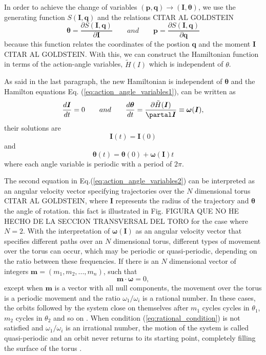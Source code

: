 In order to achieve the change of variables $(\bm{p},\bm{q})\rightarrow (\bm{I},\bm{\theta})$, we use the generating function $S(\bm{I},\bm{q})$ and the relations CITAR AL GOLDSTEIN
\begin{equation}
\bm{\theta}=\frac{\partial S(\bm{I},\bm{q})}{\partial \bm{I}} \qquad and\qquad \bm{p}=\frac{\partial S(\bm{I},\bm{q})}{\partial \bm{q}}
\end{equation}
because this function relates the  coordinates of the postion $\bm{q}$ and the  moment $\bm{I}$ CITAR AL GOLDSTEIN. With this, we can construct the Hamiltonian function in terms of the action-angle variables, $\tilde{H}(I)$ which is independent of $\theta$.\par

As said in the last paragraph, the new Hamiltonian is independent of $\bm{\theta}$ and the Hamilton equations Eq. (\ref{eq:action_angle_variables1}), can be written as 
\begin{equation}
\frac{d\bm{I}}{dt}=0 \qquad and \qquad \frac{d\bm{\theta}}{dt}=\frac{\partial \tilde{H}(\bm{I})}{\partal \bm{I}}\equiv \bm{\omega}(\bm{I}),
\label{eq:action_angle_variables2}
\end{equation}
their solutions are
\begin{equation}
\bm{I}(t)=\bm{I}(0)
\end{equation}
and
\begin{equation}
\bm{\theta}(t)=\bm{\theta}(0)+\bm{\omega}(\bm{I})t
\end{equation}
where each angle variable is periodic with a period of $2\pi$.\par

The second equation in Eq.(\ref{eq:action_angle_variables2}) can be interpreted as an angular velocity vector specifying trajectories over the $N$ dimensional torus CITAR AL GOLDSTEIN, where $\bm{I}$ represents the radius of the trajectory and $\bm{\theta}$ the angle of rotation. this fact is illustrated in Fig. FIGURA QUE NO HE HECHO DE LA SECCION TRANSVERSAL DEL TORO for the case where $N=2$. With the interpretation of $\bm{\omega}(\bm{I})$ as an angular velocity vector that specifies different paths over an $N$ dimensional torus, different types of movement over the torus can occur, which may be periodic or quasi-periodic, depending on the ratio between these frequencies. If there is an $N$ dimensional vector of integers $\bm{m}=(m_1,m_2,...,m_n)$, such that
\begin{equation}
\bm{m}\cdot \bm{\omega}=0,
\label{eq:rational_condition}
\end{equation}
except when $\bm{m}$ is a vector with all null components, the movement over the torus is a periodic movement and the ratio $\omega_1/\omega_i$ is a rational number. In these cases, the orbits followed by the system close on themselves after $m_1$ cycles cycles in $\theta_1$, $m_2$ cycles in $\theta_2$ and so on \cite{ottChaosDynamicalSystems2002}. When condition (\ref{eq:rational_condition}) is not satisfied and $\omega_1/\omega_i$ is an irrational number, the motion of the system is called quasi-periodic and an orbit never returns to its starting point, completely filling the surface of the torus \cite{ottChaosDynamicalSystems2002}.\par

